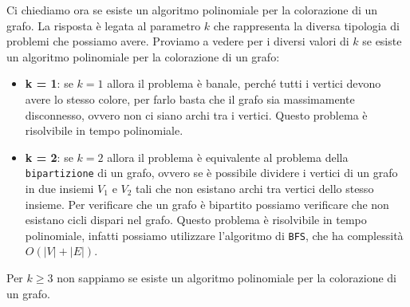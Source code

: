 Ci chiediamo ora se esiste un algoritmo polinomiale per la colorazione di un grafo.
La risposta è legata al parametro $k$ che rappresenta la diversa tipologia di 
problemi che possiamo avere. Proviamo a vedere per i diversi valori di $k$ se esiste
un algoritmo polinomiale per la colorazione di un grafo:
\begin{itemize}
    \item \textbf{k = 1}: se $k = 1$ allora il problema è banale, perché tutti i vertici
    devono avere lo stesso colore, per farlo basta che il grafo sia massimamente disconnesso,
    ovvero non ci siano archi tra i vertici. Questo problema è risolvibile in tempo polinomiale.
    \item \textbf{k = 2}: se $k = 2$ allora il problema è equivalente al problema della
    \texttt{bipartizione} di un grafo, ovvero se è possibile dividere i vertici di un grafo
    in due insiemi $V_1$ e $V_2$ tali che non esistano archi tra vertici dello stesso insieme.
    Per verificare che un grafo è bipartito possiamo verificare che non esistano cicli dispari
    nel grafo. Questo problema è risolvibile in tempo polinomiale, infatti possiamo utilizzare
    l'algoritmo di \texttt{BFS}, che ha complessità $O(|V| + |E|)$.
\end{itemize}
Per $k \geq 3$ non sappiamo se esiste un algoritmo polinomiale per la colorazione di un grafo.

